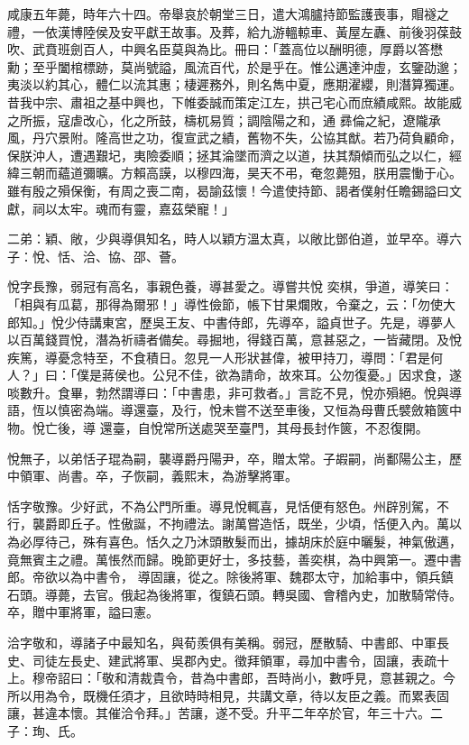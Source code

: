 \begin{pinyinscope}
 咸康五年薨，時年六十四。帝舉哀於朝堂三日，遣大鴻臚持節監護喪事，賵襚之禮，一依漢博陸侯及安平獻王故事。及葬，給九游轀輬車、黃屋左纛、前後羽葆鼓吹、武賁班劍百人，中興名臣莫與為比。冊曰：「蓋高位以酬明德，厚爵以答懋勳；至乎闔棺標跡，莫尚號謚，風流百代，於是乎在。惟公邁達沖虛，玄鑒劭邈；夷淡以約其心，體仁以流其惠；棲遲務外，則名雋中夏，應期濯纓，則潛算獨運。昔我中宗、肅祖之基中興也，下帷委誠而策定江左，拱己宅心而庶績咸熙。故能威之所振，寇虐改心，化之所鼓，檮杌易質；調陰陽之和，通
 彞倫之紀，遼隴承風，丹穴景附。隆高世之功，復宣武之績，舊物不失，公協其猷。若乃荷負顧命，保朕沖人，遭遇艱圮，夷險委順；拯其淪墜而濟之以道，扶其頹傾而弘之以仁，經緯三朝而蘊道彌曠。方賴高謨，以穆四海，昊天不弔，奄忽薨殂，朕用震慟于心。雖有殷之殞保衡，有周之喪二南，曷諭茲懷！今遣使持節、謁者僕射任瞻錫謚曰文獻，祠以太牢。魂而有靈，嘉茲榮寵！」



 二弟：穎、敞，少與導俱知名，時人以穎方溫太真，以敞比鄧伯道，並早卒。導六子：悅、恬、洽、協、邵、薈。



 悅字長豫，弱冠有高名，事親色養，導甚愛之。導嘗共悅
 奕棋，爭道，導笑曰：「相與有瓜葛，那得為爾邪！」導性儉節，帳下甘果爛敗，令棄之，云：「勿使大郎知。」悅少侍講東宮，歷吳王友、中書侍郎，先導卒，謚貞世子。先是，導夢人以百萬錢買悅，潛為祈禱者備矣。尋掘地，得錢百萬，意甚惡之，一皆藏閉。及悅疾篤，導憂念特至，不食積日。忽見一人形狀甚偉，被甲持刀，導問：「君是何人？」曰：「僕是蔣侯也。公兒不佳，欲為請命，故來耳。公勿復憂。」因求食，遂啖數升。食畢，勃然謂導曰：「中書患，非可救者。」言訖不見，悅亦殞絕。悅與導語，恆以慎密為端。導還臺，及行，悅未嘗不送至車後，又恒為母曹氏襞斂箱篋中物。悅亡後，導
 還臺，自悅常所送處哭至臺門，其母長封作篋，不忍復開。



 悅無子，以弟恬子琨為嗣，襲導爵丹陽尹，卒，贈太常。子嘏嗣，尚鄱陽公主，歷中領軍、尚書。卒，子恢嗣，義熙末，為游擊將軍。



 恬字敬豫。少好武，不為公門所重。導見悅輒喜，見恬便有怒色。州辟別駕，不行，襲爵即丘子。性傲誕，不拘禮法。謝萬嘗造恬，既坐，少頃，恬便入內。萬以為必厚待己，殊有喜色。恬久之乃沐頭散髮而出，據胡床於庭中曬髮，神氣傲邁，竟無賓主之禮。萬悵然而歸。晚節更好士，多技藝，善奕棋，為中興第一。遷中書郎。帝欲以為中書令，
 導固讓，從之。除後將軍、魏郡太守，加給事中，領兵鎮石頭。導薨，去官。俄起為後將軍，復鎮石頭。轉吳國、會稽內史，加散騎常侍。卒，贈中軍將軍，謚曰憲。



 洽字敬和，導諸子中最知名，與荀羨俱有美稱。弱冠，歷散騎、中書郎、中軍長史、司徒左長史、建武將軍、吳郡內史。徵拜領軍，尋加中書令，固讓，表疏十上。穆帝詔曰：「敬和清裁貴令，昔為中書郎，吾時尚小，數呼見，意甚親之。今所以用為令，既機任須才，且欲時時相見，共講文章，待以友臣之義。而累表固讓，甚違本懷。其催洽令拜。」苦讓，遂不受。升平二年卒於官，年三十六。二子：珣、氏。




\end{pinyinscope}

